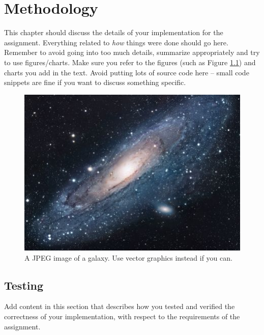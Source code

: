 \chapter{Methodology}
This chapter should discuss the details of your implementation for the assignment. 
Everything related to \emph{how} things were done should go here.
Remember to avoid going into too much details, summarize appropriately and try to use figures/charts.
Make sure you refer to the figures (such as Figure \ref{fig:universe}) and charts you add in the text.
Avoid putting lots of source code here -- small code snippets are fine if you want to discuss something specific.

\begin{figure}
\centering
\includegraphics[scale=1.7]{images/universe.jpg}
\caption{A JPEG image of a galaxy. Use vector graphics instead if you can.}
\label{fig:universe}
\end{figure}

\section{Testing}
Add content in this section that describes how you tested and verified the correctness of your implementation, with respect to the requirements of the assignment.